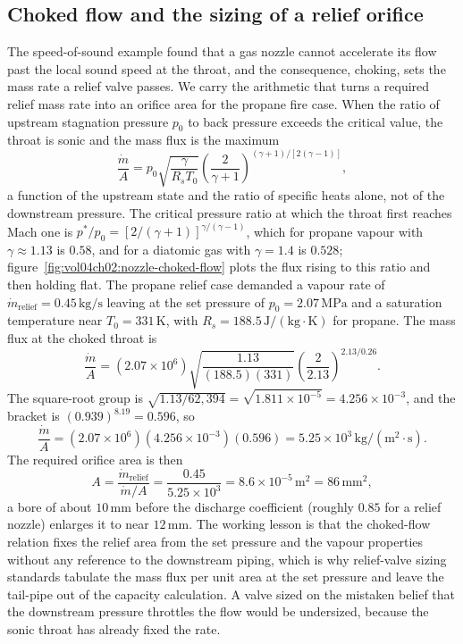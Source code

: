 \subsection{Choked flow and the sizing of a relief orifice}

The speed-of-sound example found that a gas nozzle cannot accelerate its flow
past the local sound speed at the throat, and the consequence, choking, sets
the mass rate a relief valve passes. We carry the arithmetic that turns a
required relief mass rate into an orifice area for the propane fire case. When
the ratio of upstream stagnation pressure $p_0$ to back pressure exceeds the
critical value, the throat is sonic and the mass flux is the maximum
\[
\frac{\dot{m}}{A} = p_0\sqrt{\frac{\gamma}{R_s T_0}}\left(\frac{2}{\gamma +
1}\right)^{(\gamma + 1)/[2(\gamma - 1)]},
\]
a function of the upstream state and the ratio of specific heats alone, not
of the downstream pressure. The critical pressure ratio at which the throat
first reaches Mach one is $p^*/p_0 = [2/(\gamma + 1)]^{\gamma/(\gamma - 1)}$,
which for propane vapour with $\gamma \approx 1.13$ is $0.58$, and for a
diatomic gas with $\gamma = 1.4$ is $0.528$;
figure~\ref{fig:vol04ch02:nozzle-choked-flow} plots the flux rising to this
ratio and then holding flat. The propane relief case demanded a vapour rate
of $\dot{m}_{\text{relief}} = 0.45\,\text{kg}/\text{s}$ leaving at the set
pressure of $p_0 = 2.07\,\text{MPa}$ and a saturation temperature near
$T_0 = 331\,\si{\kelvin}$, with $R_s = 188.5\,\text{J}/(\text{kg}\cdot
\si{\kelvin})$ for propane. The mass flux at the choked throat is
\[
\frac{\dot{m}}{A} = (2.07\times 10^6)\sqrt{\frac{1.13}{(188.5)(331)}}\left(
\frac{2}{2.13}\right)^{2.13/0.26}.
\]
The square-root group is $\sqrt{1.13/62{,}394} = \sqrt{1.811\times 10^{-5}} =
4.256\times 10^{-3}$, and the bracket is $(0.939)^{8.19} = 0.596$, so
\[
\frac{\dot{m}}{A} = (2.07\times 10^6)(4.256\times 10^{-3})(0.596) = 5.25
\times 10^3\,\text{kg}/(\text{m}^2\cdot\text{s}).
\]
The required orifice area is then
\[
A = \frac{\dot{m}_{\text{relief}}}{\dot{m}/A} = \frac{0.45}{5.25\times 10^3}
= 8.6\times 10^{-5}\,\text{m}^2 = 86\,\text{mm}^2,
\]
a bore of about $10\,\text{mm}$ before the discharge coefficient (roughly
$0.85$ for a relief nozzle) enlarges it to near $12\,\text{mm}$. The working
lesson is that the choked-flow relation fixes the relief area from the set
pressure and the vapour properties without any reference to the downstream
piping, which is why relief-valve sizing standards tabulate the mass flux per
unit area at the set pressure and leave the tail-pipe out of the capacity
calculation. A valve sized on the mistaken belief that the downstream
pressure throttles the flow would be undersized, because the sonic throat has
already fixed the rate.

